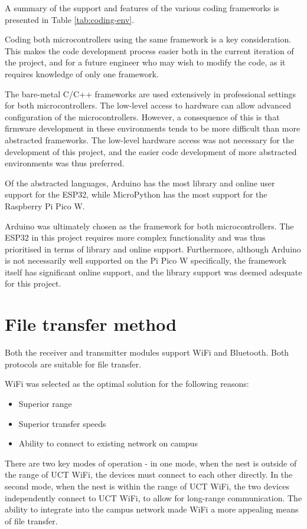 A summary of the support and features of the various coding frameworks is presented in Table \ref{tab:coding-env}.

Coding both microcontrollers using the same framework is a key consideration. This makes the code development process easier both in the current iteration of the project, and for a future engineer who may wish to modify the code, as it requires knowledge of only one framework. 

The bare-metal C/C++ frameworks are used extensively in professional settings for both microcontrollers. The low-level access to hardware can allow advanced configuration of the microcontrollers. However, a consequence of this is that firmware development in these environments tends to be more difficult than more abstracted frameworks. The low-level hardware access was not necessary for the development of this project, and the easier code development of more abstracted environments was thus preferred.

Of the abstracted languages, Arduino has the most library and online user support for the ESP32, while MicroPython has the most support for the Raspberry Pi Pico W.

Arduino was ultimately chosen as the framework for both microcontrollers. The ESP32 in this project requires more complex functionality and was thus prioritised in terms of library and online support. Furthermore, although Arduino is not necessarily well supported on the Pi Pico W specifically, the framework itself has significant online support, and the library support was deemed adequate for this project.

\section{File transfer method}

Both the receiver and transmitter modules support WiFi and Bluetooth. Both protocols are suitable for file transfer.

WiFi was selected as the optimal solution for the following reasons:

\begin{itemize}
    \item Superior range
    \item Superior transfer speeds
    \item Ability to connect to existing network on campus
\end{itemize}

There are two key modes of operation - in one mode, when the nest is outside of the range of UCT WiFi, the devices must connect to each other directly. In the second mode, when the nest is within the range of UCT WiFi, the two devices independently connect to UCT WiFi, to allow for long-range communication. The ability to integrate into the campus network made WiFi a more appealing means of file transfer.

